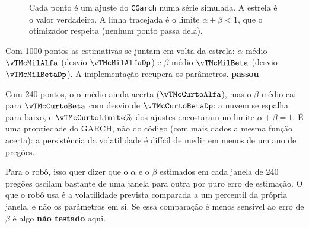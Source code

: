 \documentclass[11pt,a4paper]{article}
\newcommand{\arq}[1]{../../../dados/verificacao/testes_formulas_2026-10-30/#1}
\newcommand{\ok}{\textcolor{cok}{\textbf{passou}}}
\begin{document}
\begin{figure}[htbp]
\centering
{}
\caption{Cada ponto é um ajuste do \texttt{CGarch} numa série simulada. A estrela é o valor verdadeiro. A linha
tracejada é o limite $\alpha + \beta < 1$, que o otimizador respeita (nenhum ponto passa dela).}
\label{fig:garchmc}
\end{figure}

Com 1000 pontos as estimativas se juntam em volta da estrela: $\alpha$ médio $\vTMcMilAlfa$ (desvio
$\vTMcMilAlfaDp$) e $\beta$ médio $\vTMcMilBeta$ (desvio $\vTMcMilBetaDp$). A implementação recupera os
parâmetros. \ok

\begin{cuidado}
Com 240 pontos, o $\alpha$ médio ainda acerta ($\vTMcCurtoAlfa$), mas o $\beta$ médio cai para $\vTMcCurtoBeta$
com desvio de $\vTMcCurtoBetaDp$: a nuvem se espalha para baixo, e $\vTMcCurtoLimite\%$ dos ajustes encostaram no
limite $\alpha + \beta = 1$. É uma propriedade do GARCH, não do código (com mais dados a mesma função acerta): a
persistência da volatilidade é difícil de medir em menos de um ano de pregões.

Para o robô, isso quer dizer que o $\alpha$ e o $\beta$ estimados em cada janela de 240 pregões oscilam bastante
de uma janela para outra por puro erro de estimação. O que o robô usa é a volatilidade prevista comparada a um
percentil da própria janela, e não os parâmetros em si. Se essa comparação é menos sensível ao erro de $\beta$ é
algo \textbf{não testado} aqui.
\end{cuidado}
\end{document}
